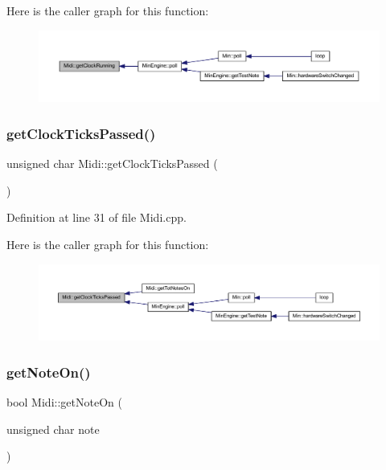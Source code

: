 Here is the caller graph for this function\+:
\nopagebreak
\begin{figure}[H]
\begin{center}
\leavevmode
\includegraphics[width=350pt]{class_midi_ad4330bfa4bc5e7342eed4b083fcae837_icgraph}
\end{center}
\end{figure}
\mbox{\label{class_midi_aaa7e1badd1370989aad99509b95b343b}} 
\subsubsection{\texorpdfstring{get\+Clock\+Ticks\+Passed()}{getClockTicksPassed()}}
{\footnotesize\ttfamily unsigned char Midi\+::get\+Clock\+Ticks\+Passed (\begin{DoxyParamCaption}{ }\end{DoxyParamCaption})}



Definition at line 31 of file Midi.\+cpp.

Here is the caller graph for this function\+:
\nopagebreak
\begin{figure}[H]
\begin{center}
\leavevmode
\includegraphics[width=350pt]{class_midi_aaa7e1badd1370989aad99509b95b343b_icgraph}
\end{center}
\end{figure}
\mbox{\label{class_midi_a7e93abeb7622eeaa7dbe8480de030d0b}} 
\subsubsection{\texorpdfstring{get\+Note\+On()}{getNoteOn()}}
{\footnotesize\ttfamily bool Midi\+::get\+Note\+On (\begin{DoxyParamCaption}\item[{unsigned char}]{note }\end{DoxyParamCaption})\hspace{0.3cm}{\ttfamily [inline]}}



